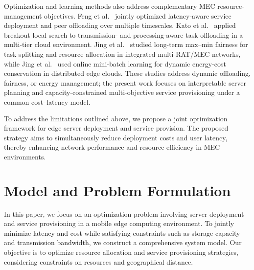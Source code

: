 \documentclass[10pt, conference, letterpaper]{IEEEtran}
\begin{document}
Optimization and learning methods also address complementary MEC resource-management objectives. Feng et al.~\cite{b33} jointly optimized latency-aware service deployment and peer offloading over multiple timescales. Kato et al.~\cite{b34} applied breakout local search to transmission- and processing-aware task offloading in a multi-tier cloud environment. Jing et al.~\cite{b35} studied long-term max--min fairness for task splitting and resource allocation in integrated multi-RAT/MEC networks, while Jing et al.~\cite{b36} used online mini-batch learning for dynamic energy-cost conservation in distributed edge clouds. These studies address dynamic offloading, fairness, or energy management; the present work focuses on interpretable server planning and capacity-constrained multi-objective service provisioning under a common cost--latency model.


To address the limitations outlined above, we propose a joint optimization framework for edge server deployment and service provision. The proposed strategy aims to simultaneously reduce deployment costs and user latency, thereby enhancing network performance and resource efficiency in MEC environments.

\section{Model and Problem Formulation}
In this paper, we focus on an optimization problem involving server deployment and service provisioning in a mobile edge computing environment. To jointly minimize latency and cost while satisfying constraints such as storage capacity and transmission bandwidth, we construct a comprehensive system model. Our objective is to optimize resource allocation and service provisioning strategies, considering constraints on resources and geographical distance. 
\end{document}
